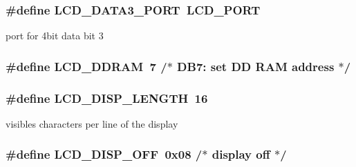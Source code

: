 \subsubsection[{\texorpdfstring{L\+C\+D\+\_\+\+D\+A\+T\+A3\+\_\+\+P\+O\+RT}{LCD_DATA3_PORT}}]{\setlength{\rightskip}{0pt plus 5cm}\#define L\+C\+D\+\_\+\+D\+A\+T\+A3\+\_\+\+P\+O\+RT~{\bf L\+C\+D\+\_\+\+P\+O\+RT}}\hypertarget{group__pfleury__lcd_gaec71b6692f2af7c9de32dbe85fcb51c2}{}\label{group__pfleury__lcd_gaec71b6692f2af7c9de32dbe85fcb51c2}
port for 4bit data bit 3 
\subsubsection[{\texorpdfstring{L\+C\+D\+\_\+\+D\+D\+R\+AM}{LCD_DDRAM}}]{\setlength{\rightskip}{0pt plus 5cm}\#define L\+C\+D\+\_\+\+D\+D\+R\+AM~7      /$\ast$ D\+B7\+: set DD R\+AM address             $\ast$/}\hypertarget{group__pfleury__lcd_gae54acf3ccc45b7d6be334a03627740c6}{}\label{group__pfleury__lcd_gae54acf3ccc45b7d6be334a03627740c6}
\subsubsection[{\texorpdfstring{L\+C\+D\+\_\+\+D\+I\+S\+P\+\_\+\+L\+E\+N\+G\+TH}{LCD_DISP_LENGTH}}]{\setlength{\rightskip}{0pt plus 5cm}\#define L\+C\+D\+\_\+\+D\+I\+S\+P\+\_\+\+L\+E\+N\+G\+TH~16}\hypertarget{group__pfleury__lcd_ga684bb4392e384b7ae7c660d81dacb930}{}\label{group__pfleury__lcd_ga684bb4392e384b7ae7c660d81dacb930}
visibles characters per line of the display 
\subsubsection[{\texorpdfstring{L\+C\+D\+\_\+\+D\+I\+S\+P\+\_\+\+O\+FF}{LCD_DISP_OFF}}]{\setlength{\rightskip}{0pt plus 5cm}\#define L\+C\+D\+\_\+\+D\+I\+S\+P\+\_\+\+O\+FF~0x08   /$\ast$ display off                            $\ast$/}\hypertarget{group__pfleury__lcd_gaa2966175115943883f51e9c90478540c}{}\label{group__pfleury__lcd_gaa2966175115943883f51e9c90478540c}
